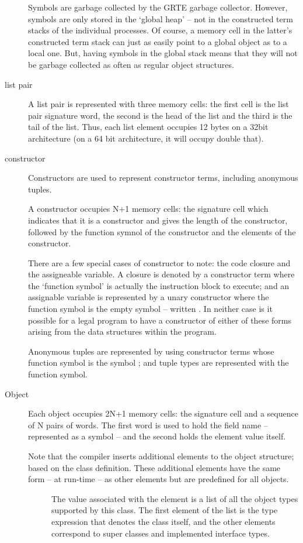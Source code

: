 \begin{description}
Symbols are garbage collected by the GRTE garbage collector. However, symbols are only stored in  the `global heap' -- not in the constructed term stacks of the individual processes. Of course, a memory cell in the latter's constructed term stack can just as easily point to a global object as to a local one. But, having symbols in the global stack means that they will not be garbage collected as often as regular object structures.

\item[list pair]
A list pair is represented with three memory cells: the first cell is the list pair signature word, the second is the head of the list and the third is the tail of the list. Thus, each list element occupies 12 bytes on a 32bit architecture (on a 64 bit architecture, it will occupy double that).

\item[constructor]
Constructors are used to represent constructor terms, including anonymous tuples.

A constructor occupies N+1 memory cells: the signature cell which indicates that it is a constructor and gives the length of the constructor, followed by the function symnol of the constructor and the elements of the constructor.

There are a few special cases of constructor to note: the code closure and the assigneable variable. A closure is denoted by a constructor term where the `function symbol' is actually the instruction block to execute; and an assignable variable is represented by a unary constructor where the function symbol is the empty symbol -- written . In neither case is it possible for a legal \go program to have a constructor of either of these forms arising from the data structures within the program. 

Anonymous tuples are represented by using constructor terms whose function symbol is the symbol ; and tuple types are represented with the  function symbol.

\item[Object]
Each object occupies 2N+1 memory cells: the signature cell and a sequence of N pairs of words. The first word is used to hold the field name -- represented as a symbol -- and the second holds the element value itself.

Note that the \go compiler inserts additional elements to the object structure; based on the class definition. These additional elements have the same form -- at run-time -- as other elements but are predefined for all objects. 
\begin{description}
\item[]
The value associated with the  element is a list of all the object types supported by this class. The first element of the list is the type expression that denotes the class itself, and the other elements correspond to super classes and implemented interface types.


\end{description}
\end{description}
